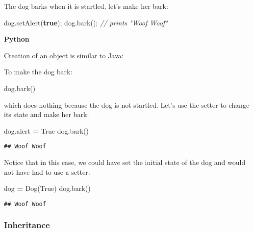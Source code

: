 \documentclass[]{article}
\newenvironment{Shaded}{\begin{snugshade}}{\end{snugshade}}
\newcommand{\KeywordTok}[1]{\textcolor[rgb]{0.13,0.29,0.53}{\textbf{{#1}}}}
\newcommand{\CommentTok}[1]{\textcolor[rgb]{0.56,0.35,0.01}{\textit{{#1}}}}
\newcommand{\FunctionTok}[1]{\textcolor[rgb]{0.00,0.00,0.00}{{#1}}}
\newcommand{\VariableTok}[1]{\textcolor[rgb]{0.00,0.00,0.00}{{#1}}}
\newcommand{\OperatorTok}[1]{\textcolor[rgb]{0.81,0.36,0.00}{\textbf{{#1}}}}
\newcommand{\NormalTok}[1]{{#1}}
\begin{document}
The dog barks when it is startled, let's make her bark:

\begin{Shaded}
\begin{Highlighting}[]
\NormalTok{dog.}\FunctionTok{setAlert}\NormalTok{(}\KeywordTok{true}\NormalTok{);}
\NormalTok{dog.}\FunctionTok{bark}\NormalTok{();}
\CommentTok{// prints "Woof Woof"}
\end{Highlighting}
\end{Shaded}

\textbf{Python}

Creation of an object is similar to Java:

To make the dog bark:

\begin{Shaded}
\begin{Highlighting}[]
\NormalTok{dog.bark()}
\end{Highlighting}
\end{Shaded}

which does nothing because the dog is not startled. Let's use the setter
to change its state and make her bark:

\begin{Shaded}
\begin{Highlighting}[]
\NormalTok{dog.alert }\OperatorTok{=} \VariableTok{True}
\NormalTok{dog.bark()}
\end{Highlighting}
\end{Shaded}

\begin{verbatim}
## Woof Woof
\end{verbatim}

Notice that in this case, we could have set the initial state of the dog
and would not have had to use a setter:

\begin{Shaded}
\begin{Highlighting}[]
\NormalTok{dog }\OperatorTok{=} \NormalTok{Dog(}\VariableTok{True}\NormalTok{)}
\NormalTok{dog.bark()}
\end{Highlighting}
\end{Shaded}

\begin{verbatim}
## Woof Woof
\end{verbatim}

\subsubsection{Inheritance}\label{inheritance}
\end{document}
